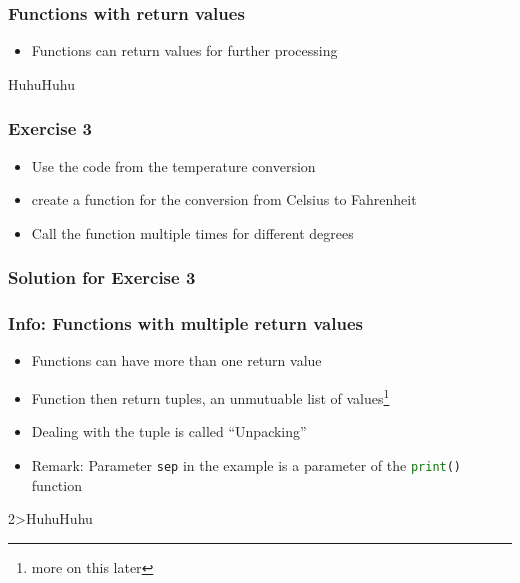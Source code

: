 \documentclass[english]{beamer}
\newcommand{\ta}[1]{\textattachfile[color=1 0 0]{#1}{Code}}
\begin{document}
\begin{frame}[containsverbatim]
\frametitle{Functions with return values}

\begin{itemize}
	\item Functions can return values for further processing
\end{itemize}



\begin{ausgabe}
HuhuHuhu
\end{ausgabe}

\end{frame}


\begin{frame}
\frametitle{Exercise 3}

\begin{itemize}
\item Use the code from the temperature conversion 
\item create a function for the conversion from Celsius to Fahrenheit
\item Call the function multiple times for different degrees
\end{itemize}
\end{frame}

\begin{frame}[containsverbatim]
\frametitle{Solution for Exercise 3}





\end{frame}


\begin{frame}[containsverbatim]
\frametitle{Info: Functions with multiple return values}

\begin{itemize}
	\item Functions can have more than one return value
	\item Function then return tuples, an unmutuable list of values\footnote{more on this later}
	\item Dealing with the tuple is called \enquote{Unpacking}
	\item Remark: Parameter \texttt{sep} in the example is a parameter \newline of the \lstinline[language={Python}]{print()}  function
\end{itemize}



\vspace*{-1em}
\begin{ausgabe}
2>HuhuHuhu
\end{ausgabe}
\end{frame}
\end{document}
